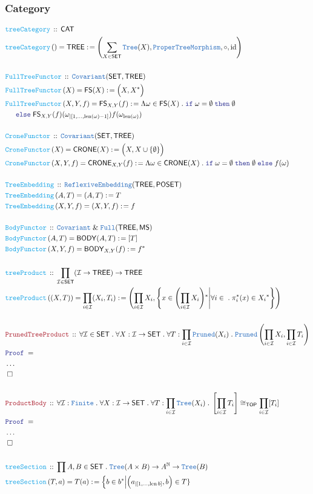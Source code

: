 \documentclass[12pt]{scrartcl}
\newcommand{\TYPE}[1]{\textcolor{NavyBlue}{\mathtt{#1}}}
\newcommand{\FUNC}[1]{\textcolor{Cerulean}{\mathtt{#1}}}
\newcommand{\LOGIC}[1]{\textcolor{Blue}{\mathtt{#1}}}
\newcommand{\THM}[1]{\textcolor{Maroon}{\mathtt{#1}}}
\renewcommand{\.}{\; . \;}
\newcommand{\de}{: \kern 0.1pc =}
\newcommand{\If}{\LOGIC{if} \;}
\newcommand{\Then}{ \; \LOGIC{then} \;}
\newcommand{\Else}{\; \LOGIC{else} \;}
\newcommand{\Act}[1]{\left( #1 \right)}
\newcommand{\Theorem}[2]{& \THM{#1} \, :: \, #2 \\ & \Proof = \\ }
\newcommand{\DeclareFunc}[2]{& \FUNC{#1} \, :: \, #2 \\}
\newcommand{\DefineNamedFunc}[4]{&  \FUNC{#1}\Act{#2} = #3 \de #4 \\}
\newcommand{\NewLine}{\\ & \kern 1pc}
\newcommand{\Page}[1]{ \begin{align*} #1 \end{align*}   }
\newcommand{\NoProof}{ & \ldots \\ \EndProof}
\renewcommand{\And}{\; \& \;}
\newcommand{\Nat}{\mathbb{N} }
\DeclareMathOperator*{\id}{id}
\newcommand{\QED}{\; \square}
\newcommand{\EndProof}{& \QED \\}
\newcommand{\Proof}{\LOGIC{Proof} \; }
\newcommand{\Cov}{\TYPE{Covariant}}
\newcommand{\I}{\mathcal{I}}
\newcommand{\CAT}{\mathsf{CAT}}
\newcommand{\SET}{\mathsf{SET}}
\newcommand{\POSET}{\mathsf{POSET}}
\newcommand{\TOP}{\mathsf{TOP}}
\newcommand{\MS}{\mathsf{MS}}
\newcommand{\FS}[1]{{#1}{}^*}
\newcommand{\Tree}{\TYPE{Tree}}
\newcommand{\PTM}{\TYPE{ProperTreeMorphism}}
\DeclareMathOperator{\len}{len}
\newcommand{\inits}[2]{{#1}_{|\left[1,\ldots,#2\right]}}
\newcommand{\TREE}{\mathsf{TREE}}
\newcommand{\FSF}{\mathsf{FS}}
\newcommand{\CRONE}{\mathsf{CRONE}}
\newcommand{\BODY}{\mathsf{BODY}}
\begin{document}
\subsubsection{Category}
\Page{
	\DeclareFunc{treeCategory}{\CAT}
	\DefineNamedFunc{treeCategory}{}{\TREE}
	{
		\left(
			\sum_{X \in \SET} \Tree(X),
			\PTM,
			\circ,
			\id
		\right)
	}
	\\
	\DeclareFunc{FullTreeFunctor}{\Cov(\SET,\TREE)}
	\DefineNamedFunc{FullTreeFunctor}{X}{\FSF(X)}{\Big(X,\FS{X}\Big)}
	\DefineNamedFunc{FullTreeFunctor}{X,Y,f}{\FSF_{X,Y}(f)}
	{ 
		\Lambda \omega \in \FSF(X) \. 
		\If \omega = \emptyset 
		\Then \emptyset \NewLine
		\Else \FSF_{X,Y}(f)(\inits{\omega}{\len(\omega)-1})f(\omega_{\len(\omega)}) 
	}	
	\\
	\DeclareFunc{CroneFunctor}{\Cov(\SET,\TREE)}
	\DefineNamedFunc{CroneFunctor}{X}{\CRONE(X)}{\Big(X, X \cup \{\emptyset\}  \Big)}
	\DefineNamedFunc{CroneFunctor}{X,Y,f}{\CRONE_{X,Y}(f)}
	{ 
		\Lambda \omega \in \CRONE(X) \. 
		\If \omega = \emptyset 
		\Then \emptyset
		\Else f(\omega)
	}	
	\\
	\DeclareFunc{TreeEmbedding}{\TYPE{ReflexiveEmbedding}(\TREE, \POSET)}
	\DefineNamedFunc{TreeEmbedding}{A,T}{(A,T)}{T}
	\DefineNamedFunc{TreeEmbedding}{X,Y,f}{(X,Y,f)}{f}
	\\
	\DeclareFunc{BodyFunctor}{\Cov \And \TYPE{Full}(\TREE, \MS)}
	\DefineNamedFunc{BodyFunctor}{A,T}{\BODY(A,T)}{[T]}
	\DefineNamedFunc{BodyFunctor}{X,Y,f}{\BODY_{X,Y}(f)}{f^*}
	\\
	\DeclareFunc{treeProduct}{\prod_{\I \in \SET} (\I \to \TREE) \to \TREE}
	\DefineNamedFunc{treeProduct}{(X,T)}{\prod_{i \in \I} (X_i,T_i)}
	{
		\left( \prod_{i \in \I} X_i,    
			\left\{
				x \in \FS{\left(\prod_{i \in \I} X_i\right)}
				\Bigg|
				\forall i \in \. \pi_i^*(x) \in \FS{X_i} 
			\right\}
		\right)
	}
	\\
	\Theorem{PrunedTreeProduct}
	{
		\forall \I \in \SET \.
		\forall X : \I \to \SET \.
		\forall T : \prod_{i \in \I} \TYPE{Pruned}(X_i) \. 
		\TYPE{Pruned}\left( \prod_{i \in \I} X_i, \prod_{i \in \I} T_i \right)
	}
	\NoProof
	\\
	\Theorem{ProductBody}
	{
		\forall \I : \TYPE{Finite} \.
		\forall X : \I \to \SET \. 
		\forall T : \prod_{i \in \I}  \Tree(X_i) \.
		\left[ \prod_{i \in \I} T_i \right] \cong_\TOP \prod_{i \in \I} [T_i]
	}
	\NoProof
	\\
	\DeclareFunc{treeSection}
	{
		\prod A,B \in \SET \.
		\Tree(A \times B) \to A^\Nat \to \Tree(B)
	}
	\DefineNamedFunc{treeSection}{T,a}{T(a)}
	{
		\Big\{ b \in \FS{b} \Big|  \Big(\inits{a}{\len b}, b\Big) \in T  \}
	}
}
\newpage
\end{document}
